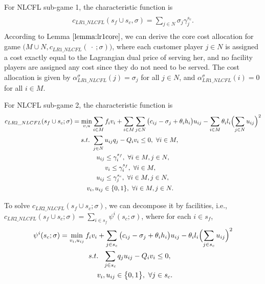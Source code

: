 \documentclass[ijoc,nonblindrev]{informs3} %
\begin{document}
For NLCFL sub-game 1, the characteristic function is
\begin{eqnarray}\label{eqn:ncgcf}
\begin{aligned}
\begin{split}
c_{LR1\_NLCFL}(s_f \cup s_c,\sigma) = \sum_{j \in N} \sigma_j\gamma_j^{s_c}.
\end{split}
\end{aligned}
\end{eqnarray}
According to Lemma $\ref{lemma:lr1core}$, we can derive the core cost allocation for game $\big(M \cup N, c_{LR1\_NLCFL}(\ \cdot \ ;\sigma)\big)$, where each customer player $j \in N$ is assigned a cost exactly equal to the Lagrangian dual price of serving her, and no facility players are assigned any cost since they do not need to be served. The cost allocation is given by $\alpha_{LR1\_NLCFL}^{\sigma}(j) = \sigma_j$ for all $j \in N$, and $\alpha_{LR1\_NLCFL}^{\sigma}(i) = 0$ for all $i \in M$.


For NLCFL sub-game 2, the characteristic function is
\begin{eqnarray*}
\begin{aligned}
\begin{split}
c_{LR2\_NLCFL}(s_f \cup s_c;\sigma) = \min_{v,u}& \sum_{i \in M} f_iv_i + \sum_{i \in M}\sum_{j \in N} \big(c_{ij} - \sigma_j + \theta_ih_i\big) u_{ij} - \sum_{i \in M} \theta_il_i \Bigl( \sum_{j \in N}u_{ij}\Bigr)^2\\
s.t.~&\sum_{j \in N}u_{ij}q_j - Q_iv_i \leq 0,~\forall i \in M,\\
~~~~&~~u_{ij} \leq \gamma_i^{s_f},~\forall i \in M, j \in N,\\
&~~~~~~v_i \leq \gamma_i^{s_f},~\forall i \in M,\\
~~~~&~~u_{ij} \leq \gamma_j^{s_c},~\forall i \in M, j \in N,\\
v_i&, u_{ij} \in \{0,1\}, ~\forall i \in M, j \in N.
\end{split}
\end{aligned}
\end{eqnarray*}

To solve $c_{LR2\_NLCFL}(s_f \cup s_c;\sigma)$, we can decompose it by facilities, i.e., $c_{LR2\_NLCFL}(s_f \cup s_c;\sigma) = \sum_{i \in s_f} \psi^i(s_c;\sigma)$, where for each $i \in s_f$,
\begin{eqnarray}\label{eqn:psi}
\begin{aligned}
\begin{split}
\psi^i(s_c;\sigma) = \min_{v_i,u_{ij}} f_iv_i + \sum_{j \in s_c} \big(c_{ij} - \sigma_j + \theta_ih_i\big)& u_{ij} - \theta_il_i \Bigl( \sum_{j \in s_c}u_{ij}\Bigr)^2\\
s.t. ~~ \sum_{j \in s_c}q_ju_{ij} - Q_iv_i \leq 0,&\\
v_i,u_{ij} \in \big\{0,1\big\},~\forall j \in s_c&.
\end{split}
\end{aligned}
\end{eqnarray}
\end{document}
